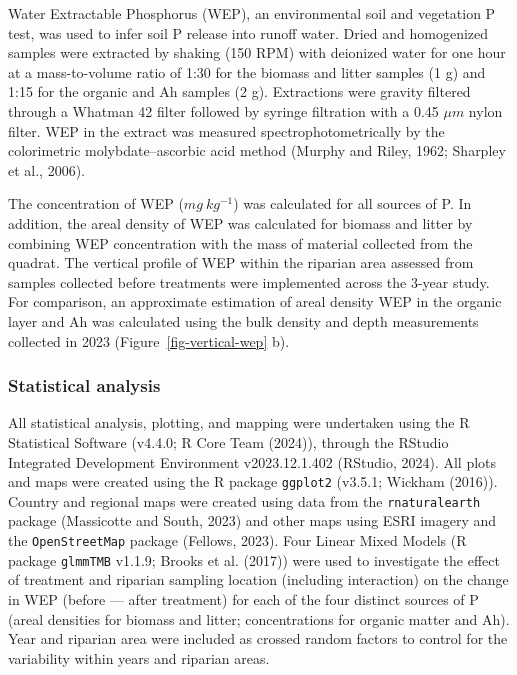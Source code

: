 \documentclass[
]{agujournal2019}
\begin{document}
Water Extractable Phosphorus (WEP), an environmental soil and vegetation
P test, was used to infer soil P release into runoff water. Dried and
homogenized samples were extracted by shaking (150 RPM) with deionized
water for one hour at a mass-to-volume ratio of 1:30 for the biomass and
litter samples (1 g) and 1:15 for the organic and Ah samples (2 g).
Extractions were gravity filtered through a Whatman 42 filter followed
by syringe filtration with a 0.45 \(\mu m\) nylon filter. WEP in the
extract was measured spectrophotometrically by the colorimetric
molybdate--ascorbic acid method (Murphy and Riley, 1962; Sharpley et
al., 2006).

The concentration of WEP (\(mg~kg^{-1}\)) was calculated for all sources
of P. In addition, the areal density of WEP was calculated for biomass
and litter by combining WEP concentration with the mass of material
collected from the quadrat. The vertical profile of WEP within the
riparian area assessed from samples collected before treatments were
implemented across the 3-year study. For comparison, an approximate
estimation of areal density WEP in the organic layer and Ah was
calculated using the bulk density and depth measurements collected in
2023 (Figure~\ref{fig-vertical-wep} b).

\subsubsection{Statistical analysis}\label{statistical-analysis}

All statistical analysis, plotting, and mapping were undertaken using
the R Statistical Software (v4.4.0; R Core Team (2024)), through the
RStudio Integrated Development Environment v2023.12.1.402 (RStudio,
2024). All plots and maps were created using the R package
\texttt{ggplot2} (v3.5.1; Wickham (2016)). Country and regional maps
were created using data from the \texttt{rnaturalearth} package
(Massicotte and South, 2023) and other maps using ESRI imagery and the
\texttt{OpenStreetMap} package (Fellows, 2023). Four Linear Mixed Models
(R package \texttt{glmmTMB} v1.1.9; Brooks et al. (2017)) were used to
investigate the effect of treatment and riparian sampling location
(including interaction) on the change in WEP (before --- after
treatment) for each of the four distinct sources of P (areal densities
for biomass and litter; concentrations for organic matter and Ah). Year
and riparian area were included as crossed random factors to control for
the variability within years and riparian areas.
\end{document}
